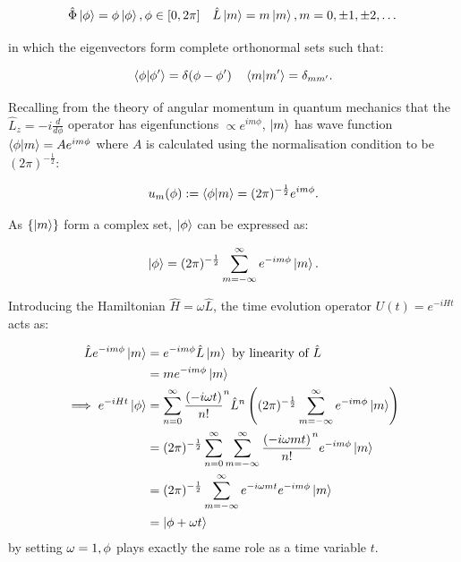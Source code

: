 \documentclass{article}
\begin{document}
\begin{equation}
	\hat{\Phi}\ket{\phi} = \phi\ket{\phi}, \phi \in [0,2\pi] \quad \hat{L}\ket{m} = m\ket{m}, m = 0, \pm 1, \pm 2,\dots
\end{equation}

\noindent in which the eigenvectors form complete orthonormal sets such that:

\begin{equation}
	\braket{\phi|\phi'} = \delta(\phi-\phi ') \quad \braket{m|m'} = \delta_{mm'}.
\end{equation}

\noindent Recalling from the theory of angular momentum in quantum mechanics that the $\hat{L}_z = -i \frac{d}{d\phi}$ operator has eigenfunctions $\propto e^{im\phi}$, $\ket{m}$ has wave function $\braket{\phi|m}= Ae^{im\phi}$ where $A$ is calculated using the normalisation condition to be $(2\pi)^{-\frac{1}{2}}$:

\begin{equation}
	u_m(\phi) := \braket{\phi|m} = (2\pi)^{-\frac{1}{2}}e^{im\phi}.
\end{equation}

\noindent As $\{\ket{m}\}$ form a complex set, $\ket{\phi}$ can be expressed as:

\begin{equation}
	\ket{\phi} = (2\pi)^{-\frac{1}{2}}\sum_{m=-\infty}^{\infty}e^{-im\phi}\ket{m}.
	\label{phiexpansion}
\end{equation}

\noindent Introducing the Hamiltonian $\hat{H}=\omega \hat{L}$, the time evolution operator $U(t) = e^{-iHt}$ acts as:

\begin{subequations}
\begin{align}
\hat{L}e^{-im\phi}\ket{m} &= e^{-im\phi}\hat{L}\ket{m} \text{ by linearity of } \hat{L} \\
				  &= me^{-im\phi}\ket{m} \\
\implies e^{-iHt}\ket{\phi} &= \sum_{n=0}^{\infty}\frac{(-i\omega t)}{n!}^n \hat{L}^n \left((2\pi)^{-\frac{1}{2}}\sum_{m=-\infty}^{\infty}e^{-im\phi}\ket{m}\right) \\
			   &= (2\pi)^{-\frac{1}{2}}\sum_{n=0}^{\infty}\sum_{m=-\infty}^{\infty} \frac{(-i\omega mt)}{n!}^n e^{-im\phi} \ket{m} \\
				   &= (2\pi)^{-\frac{1}{2}}\sum_{m=-\infty}^{\infty}e^{-i\omega mt}e^{-im\phi}\ket{m} \\
				   &= \ket{\phi+\omega t}
\end{align}
\end{subequations}
\noindent by setting $\omega = 1, \space \phi$ plays exactly the same role as a time variable $t$.
\end{document}
